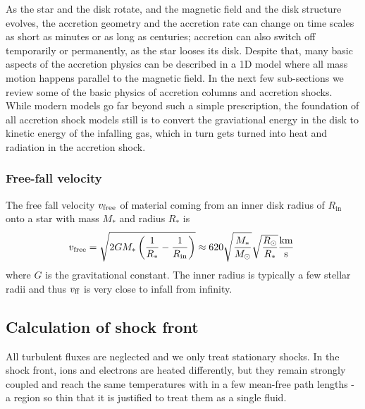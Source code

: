 As the star and the disk rotate, and the magnetic field and the disk structure evolves, the accretion geometry and the accretion rate can change on time scales as short as minutes or as long as centuries; accretion can also switch off temporarily or permanently, as the star looses its disk. Despite that, many basic aspects of the accretion physics can be described in a 1D model where all mass motion happens parallel to the magnetic field. In the next few sub-sections we review some of the basic physics of accretion columns and accretion shocks. While modern models go far beyond such a simple prescription, the foundation of all accretion shock models still is to convert the graviational energy in the disk to kinetic energy of the infalling gas, which in turn gets turned into heat and radiation in the accretion shock.

\subsubsection{Free-fall velocity}
The free fall velocity $v_{\textnormal{free}}$ of material coming from an inner disk radius of $R_\mathrm{in}$ onto a star with mass $M_*$ and radius $R_*$ is
\begin{equation} 
v_{\textnormal{free}} = \sqrt{{2GM_*} \left(\frac{1}{R_*} - \frac{1}{R_\mathrm{in}}\right)} \approx 620 \sqrt{\frac{M_*}{M_\odot}}\sqrt{\frac{R_\odot}{R_*}} \frac{\textnormal{km}}{\textnormal{s}}\ \label{eqn:freefall} 
\end{equation}
where $G$ is the gravitational constant. The inner radius is typically a few stellar radii and thus $v_\textnormal{ff}$ is very close to infall from infinity.


\subsection{Calculation of shock front}
All turbulent fluxes are neglected and we only treat stationary shocks. In the shock front, ions and electrons are heated differently, but they remain strongly coupled and reach the same temperatures with in a few mean-free path lengths - a region so thin that it is justified to treat them as a single fluid. 

